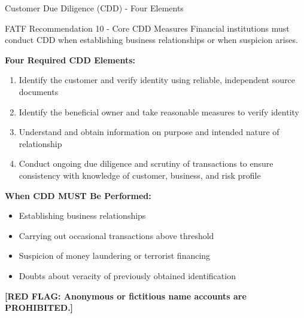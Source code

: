 \documentclass[11pt,a4paper]{beamer}
\newcommand{\redflag}[1]{\textcolor{red!80!black}{\textbf{[RED FLAG: #1]}}}
\begin{document}
	\begin{frame}{Customer Due Diligence (CDD) - Four Elements}
		\begin{block}{FATF Recommendation 10 - Core CDD Measures}
			Financial institutions must conduct CDD when establishing business relationships or when suspicion arises.
		\end{block}
		\textbf{Four Required CDD Elements:}
		\begin{enumerate}
			\item Identify the customer and verify identity using reliable, independent source documents
			\item Identify the beneficial owner and take reasonable measures to verify identity
			\item Understand and obtain information on purpose and intended nature of relationship
			\item Conduct ongoing due diligence and scrutiny of transactions to ensure consistency with knowledge of customer, business, and risk profile
		\end{enumerate}
		\textbf{When CDD MUST Be Performed:}
		\begin{itemize}
			\item Establishing business relationships
			\item Carrying out occasional transactions above threshold
			\item Suspicion of money laundering or terrorist financing
			\item Doubts about veracity of previously obtained identification
		\end{itemize}
		\redflag{Anonymous or fictitious name accounts are PROHIBITED.}
	\end{frame}
	
\end{document}
